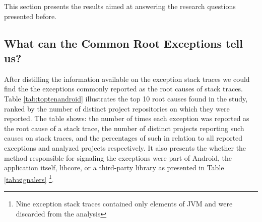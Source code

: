 \documentclass[conference]{IEEEtran}
\begin{document}

This section presents the results aimed at answering the research 
questions presented before.

\subsection{What can the Common Root Exceptions tell us? }

After distilling the information available on the exception stack traces we could find 
the the exceptions commonly reported as the root causes of stack traces.
Table \ref{tab:toptenandroid} illustrates the top 10 root causes found in the study,
 ranked by the number of distinct project repositories on which they were reported. 
The table shows: the number of times each exception was reported as 
the root cause of a stack trace, the number of distinct projects reporting such causes on stack traces, 
and the percentages of such in relation to all reported exceptions and analyzed projects respectively.
It also presents the whether the method responsible for signaling the exceptions were
part of Android, the application itself, libcore, or a third-party library as presented in Table  \ref{tab:signalers} 
 \footnote{Nine exception stack traces contained only elements of JVM and were discarded from the analysis}.


\end{document}
